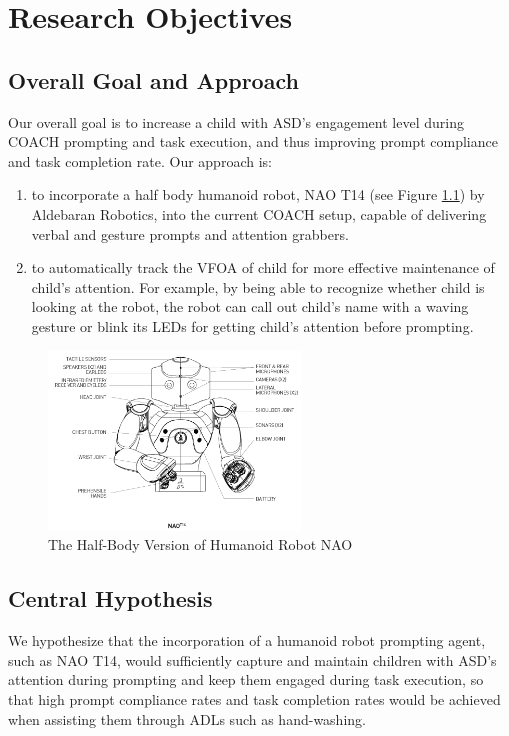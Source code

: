 \chapter{Research Objectives}

\section{Overall Goal and Approach}
Our overall goal is to increase a child with ASD's engagement level during COACH prompting and task execution, and thus improving prompt compliance and task completion rate.  Our approach is:
\begin{enumerate}
	\item to incorporate a half body humanoid robot, NAO T14 (see Figure \ref{fig:HalfBodyNAO}) by Aldebaran Robotics, into the current COACH setup, capable of delivering verbal and gesture prompts and attention grabbers.
	
	\item to automatically track the VFOA of child for more effective maintenance of child's attention.  For example, by being able to recognize whether child is looking at the robot, the robot can call out child's name with a waving gesture or blink its LEDs for getting child's attention before prompting.
	
\end{enumerate}
\begin{figure} [h]
	\centering
	\includegraphics[width=0.6\textwidth]{./img/nao_t14_schema}
	\caption{The Half-Body Version of Humanoid Robot NAO}
	\label{fig:HalfBodyNAO}
\end{figure}


\section{Central Hypothesis}
We hypothesize that the incorporation of a humanoid robot prompting agent, such as NAO T14, would sufficiently capture and maintain children with ASD's attention during prompting and keep them engaged during task execution, so that high prompt compliance rates and task completion rates would be achieved when assisting them through ADLs such as hand-washing.


